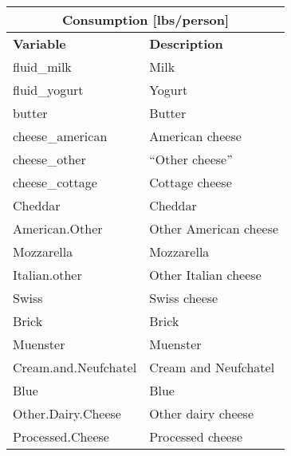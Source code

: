     \begin{longtable}{p{6cm}p{7cm}}
    \toprule
    \multicolumn{2}{c}{\textbf{Consumption [lbs/person]}} \\
    \midrule
    \textbf{Variable}                              & \textbf{Description}                                     \\
    \midrule
    fluid\_milk                           & Milk                                            \\
    fluid\_yogurt                         & Yogurt                                          \\
    butter                                & Butter                                          \\
    cheese\_american                      & American cheese                                 \\
    cheese\_other                         & ``Other cheese''                                 \\
    cheese\_cottage                       & Cottage cheese                                  \\
    Cheddar                               & Cheddar                                         \\
    American.Other                        & Other American cheese                           \\
    Mozzarella                            & Mozzarella                                      \\
    Italian.other                         & Other Italian cheese                            \\
    Swiss                                 & Swiss cheese                                    \\
    Brick                                 & Brick                                           \\
    Muenster                              & Muenster                                        \\
    Cream.and.Neufchatel                  & Cream and Neufchatel                            \\
    Blue                                  & Blue
    \\
    Other.Dairy.Cheese                    & Other dairy cheese                              \\
    Processed.Cheese                      & Processed cheese                                \\

\end{longtable}
